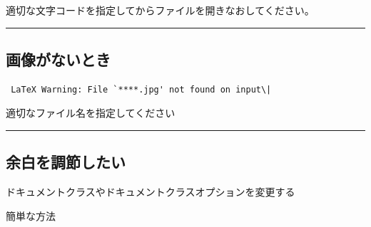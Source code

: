 適切な文字コードを指定してからファイルを開きなおしてください。

\begin{center}\rule{0.5\linewidth}{\linethickness}\end{center}

\hypertarget{ux753bux50cfux304cux306aux3044ux3068ux304d}{\subsection{画像がないとき}\label{ux753bux50cfux304cux306aux3044ux3068ux304d}}

\begin{lstlisting}
 LaTeX Warning: File `****.jpg' not found on input\|
\end{lstlisting}

適切なファイル名を指定してください

\begin{center}\rule{0.5\linewidth}{\linethickness}\end{center}

\hypertarget{ux4f59ux767dux3092ux8abfux7bc0ux3057ux305fux3044}{\subsection{余白を調節したい}\label{ux4f59ux767dux3092ux8abfux7bc0ux3057ux305fux3044}}

ドキュメントクラスやドキュメントクラスオプションを変更する

簡単な方法 \documentclass[11pt,a4paper]{jarticle}
↓
\documentclass[11pt,a4j]{jsarticle}

自前で細かい単位まで調節したい場合
 * geometory パッケージで調節する
 * setlength で調節する．辛い．
---

### geometry の例

プリアンブル部に記述する

```
\usepackage[top=30truemm,bottom=30truemm,left=25truemm,right=25truemm]{geometry}
```

### setlength の例

````
\documentclass[11pt,a4paper]{jsarticle}

\setlength{\textheight}{\paperheight}   %
\setlength{\topmargin}{4.6truemm}       %
\addtolength{\topmargin}{-\headheight}  %
\addtolength{\topmargin}{-\headsep}     %
\addtolength{\textheight}{-60truemm}    %
\setlength{\textwidth}{\paperwidth}     %
\setlength{\oddsidemargin}{-0.4truemm}  %
\setlength{\evensidemargin}{-0.4truemm} %
\addtolength{\textwidth}{-50truemm}     %


